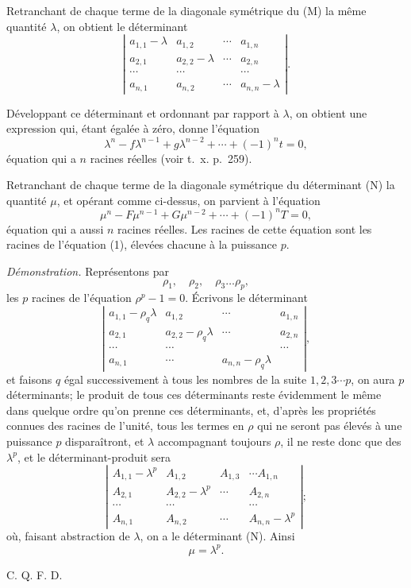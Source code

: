 \documentclass[11pt]{article}
\newcommand{\sourcepage}[1]{\marginpar{\scriptsize p.~#1}}
\begin{document}
{{Retranchant de chaque terme de la diagonale symétrique du (M) la même quantité $\lambda$, on obtient le déterminant
\[
\left|\begin{array}{cccc}
a_{1,1}-\lambda&a_{1,2}&\cdots&a_{1,n}\\
a_{2,1}&a_{2,2}-\lambda&\cdots&a_{2,n}\\
\cdots&\cdots&&\cdots\\
a_{n,1}&a_{n,2}&\cdots&a_{n,n}-\lambda
\end{array}\right|.
\tag{P}
\]

\sourcepage{365}
Développant ce déterminant et ordonnant par rapport à $\lambda$, on obtient une expression qui, étant égalée à zéro, donne l'équation
\[
\lambda^n-f\lambda^{n-1}+g\lambda^{n-2}+\cdots+(-1)^nt=0,
\tag{1}
\]
équation qui a $n$ racines réelles (voir t.~x. p.~259).

Retranchant de chaque terme de la diagonale symétrique du déterminant (N) la quantité $\mu$, et opérant comme ci-dessus, on parvient à l'équation
\[
\mu^n-F\mu^{n-1}+G\mu^{n-2}+\cdots+(-1)^nT=0,
\tag{2}
\]
équation qui a aussi $n$ racines réelles. Les racines de cette équation sont les racines de l'équation (1), élevées chacune à la puissance $p$.

\emph{Démonstration.} Représentons par
\[
\rho_1,
\quad \rho_2,
\quad \rho_3\ldots\rho_p,
\]
les $p$ racines de l'équation $\rho^p-1=0$. Écrivons le déterminant
\[
\left|\begin{array}{cccc}
a_{1,1}-\rho_q\lambda&a_{1,2}&\cdots&a_{1,n}\\
a_{2,1}&a_{2,2}-\rho_q\lambda&\cdots&a_{2,n}\\
\cdots&\cdots&&\cdots\\
a_{n,1}&\cdots&a_{n,n}-\rho_q\lambda
\end{array}\right|,
\]
et faisons $q$ égal successivement à tous les nombres de la suite $1,2,3\cdots p$, on aura $p$ déterminants; le produit de tous ces déterminants reste évidemment le même dans quelque ordre qu'on prenne ces déterminants, et, d'après les propriétés connues des racines de l'unité, tous les termes en $\rho$ qui ne seront pas élevés à une puissance $p$ disparaîtront, et $\lambda$ accompagnant toujours $\rho$, il ne reste donc que des $\lambda^p$, et le déterminant-produit sera
\[
\left|\begin{array}{cccc}
A_{1,1}-\lambda^p&A_{1,2}&A_{1,3}&\cdots A_{1,n}\\
A_{2,1}&A_{2,2}-\lambda^p&\cdots&A_{2,n}\\
\cdots&\cdots&&\cdots\\
A_{n,1}&A_{n,2}&\cdots&A_{n,n}-\lambda^p
\end{array}\right|;
\tag{Q}
\]
où, faisant abstraction de $\lambda$, on a le déterminant (N). Ainsi
\[
\mu=\lambda^p.
\]
\begin{flushright}C. Q. F. D.\end{flushright}

}}
\end{document}
